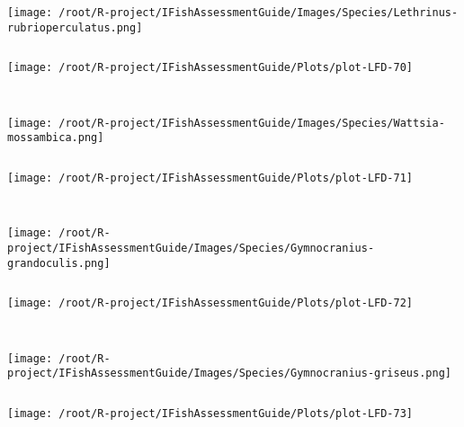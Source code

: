 \begin{knitrout}
\begin{kframe}
\begin{verbatim}
\end{verbatim}
\end{kframe}
\texttt{[image: /root/R-project/IFishAssessmentGuide/Images/Species/Lethrinus-rubrioperculatus.png]}
\begin{kframe}\begin{verbatim}
\end{verbatim}
\end{kframe}
\texttt{[image: /root/R-project/IFishAssessmentGuide/Plots/plot-LFD-70]} 
\begin{kframe}\begin{verbatim}
 
\end{verbatim}
\end{kframe}
\texttt{[image: /root/R-project/IFishAssessmentGuide/Images/Species/Wattsia-mossambica.png]}
\begin{kframe}\begin{verbatim}
\end{verbatim}
\end{kframe}
\texttt{[image: /root/R-project/IFishAssessmentGuide/Plots/plot-LFD-71]} 
\begin{kframe}\begin{verbatim}
 
\end{verbatim}
\end{kframe}
\texttt{[image: /root/R-project/IFishAssessmentGuide/Images/Species/Gymnocranius-grandoculis.png]}
\begin{kframe}\begin{verbatim}
\end{verbatim}
\end{kframe}
\texttt{[image: /root/R-project/IFishAssessmentGuide/Plots/plot-LFD-72]} 
\begin{kframe}\begin{verbatim}
 
\end{verbatim}
\end{kframe}
\texttt{[image: /root/R-project/IFishAssessmentGuide/Images/Species/Gymnocranius-griseus.png]}
\begin{kframe}\begin{verbatim}
\end{verbatim}
\end{kframe}
\texttt{[image: /root/R-project/IFishAssessmentGuide/Plots/plot-LFD-73]} 
\begin{kframe}\begin{verbatim}
 

\end{verbatim}
\end{kframe}
\end{knitrout}
